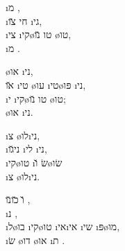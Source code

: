   \i{מ} ,\\
\i{חי}  \u{צו} \i{גי},\\
\i{צי} \i{קי}\o{טו} \u{נו} \o{טו},\\
  \i{מ} .

\o{או}  \i{ני},\\
\u{או} \i{טי} \o{עו} \i{טי}\o{פּו} \i{ני},\\
\i{י} \i{קי}\o{טו} \u{נו} \o{טו};\\
 \o{או}  \i{ני}.

  \i{צ} \o{לו}\i{ני},\\
 \i{ני}\u{גו} \i{לי}  \i{ני},\\
 \i{קי}\o{טו} \i{שׂ} \u{ו}\o{שׂו}\\
  \i{צ} \o{לו}\i{ני}.

\u{ו}  \u{כו}\u{נו}  ,\\
\i{נ}    ,\\
\i{ל}\o{בו} \i{קי}\o{טו} \i{אי}\i{אי} \i{שי}  \i{פּ}\o{מו},\\
\i{שׂ} \o{דו} \o{או} \i{ת} .
